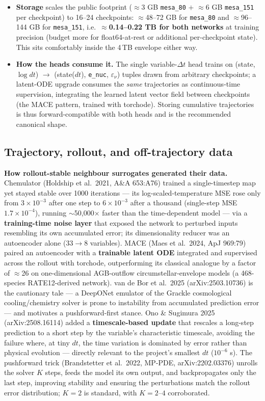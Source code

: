 \documentclass[11pt]{article}
\begin{document}
\begin{itemize}
\item \textbf{Storage} scales the public footprint ($\approx$3 GB \texttt{mesa\_80} $+$ $\approx$6 GB \texttt{mesa\_151} per checkpoint) to 16--24 checkpoints: $\approx$48--72 GB for \texttt{mesa\_80} and $\approx$96--144 GB for \texttt{mesa\_151}, i.e.\ \textbf{$\approx$0.14--0.22 TB for both networks} at training precision (budget more for float64-at-rest or additional per-checkpoint state). This sits comfortably inside the 4\,TB envelope either way.
\item \textbf{How the heads consume it.} The single variable-$\Delta t$ head trains on (state, $\log dt$) $\to$ (state($dt$), \texttt{e\_nuc}, $\varepsilon_\nu$) tuples drawn from arbitrary checkpoints; a latent-ODE upgrade consumes the \emph{same} trajectories as continuous-time supervision, integrating the learned latent vector field between checkpoints (the MACE pattern, trained with torchode). Storing cumulative trajectories is thus forward-compatible with both heads and is the recommended canonical shape.
\end{itemize}

\subsection{Trajectory, rollout, and off-trajectory data}

\textbf{How rollout-stable neighbour surrogates generated their data.} Chemulator (Holdship et al.\ 2021, A\&A 653:A76) trained a single-timestep map yet stayed stable over 1000 iterations --- its log-scaled-temperature MSE rose only from $3\times 10^{-3}$ after one step to $6\times 10^{-3}$ after a thousand (single-step MSE $1.7\times 10^{-4}$), running $\sim$50,000$\times$ faster than the time-dependent model --- via a \textbf{training-time noise layer} that exposed the network to perturbed inputs resembling its own accumulated error; its dimensionality reducer was an autoencoder alone ($33 \to 8$ variables). MACE (Maes et al.\ 2024, ApJ 969:79) paired an autoencoder with a \textbf{trainable latent ODE} integrated and supervised across the rollout with torchode, outperforming its classical analogue by a factor of $\approx$26 on one-dimensional AGB-outflow circumstellar-envelope models (a 468-species RATE12-derived network). van de Bor et al.\ 2025 (arXiv:2503.10736) is the cautionary tale --- a DeepONet emulator of the Grackle cosmological cooling/chemistry solver is prone to instability from accumulated prediction error --- and motivates a pushforward-first stance. Ono \& Sugimura 2025 (arXiv:2508.16114) added a \textbf{timescale-based update} that rescales a long-step prediction to a short step by the variable's characteristic timescale, avoiding the failure where, at tiny $dt$, the time variation is dominated by error rather than physical evolution --- directly relevant to the project's smallest $dt$ ($10^{-6}$ s). The pushforward trick (Brandstetter et al.\ 2022, MP-PDE, arXiv:2202.03376) unrolls the solver $K$ steps, feeds the model its own output, and backpropagates only the last step, improving stability and ensuring the perturbations match the rollout error distribution; $K = 2$ is standard, with $K = 2$--$4$ corroborated.
\end{document}
